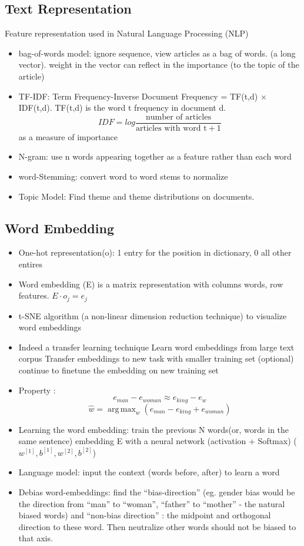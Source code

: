 \documentclass[11pt, openany]{book}              %
\DeclareMathOperator*{\argmax}{arg\,max}  %
\begin{document}
\subsection{Text Representation}

Feature representation used in Natural Language Processing (NLP)
\begin{itemize}
	\item bag-of-words model: ignore sequence, view articles as a bag of words. (a long vector). weight in the vector can reflect in the importance (to the topic of the article)
	\item TF-IDF: Term Frequency-Inverse Document Frequency = TF(t,d) $\times$ IDF(t,d). TF(t,d) is the word t frequency in document d. 
		$$IDF = log \frac{\text{number of articles}}{\text{articles with word t} + 1}$$
		as a measure of importance
	\item N-gram: use n words appearing together as a feature rather than each word
	\item word-Stemming: convert word to word stems to normalize
	\item Topic Model: Find theme and theme distributions on documents.
\end{itemize}
\subsection{Word Embedding}

\begin{itemize}
    \item One-hot representation(o): 1 entry for the position in dictionary, 0 all other entires
    \item Word embedding (E) is a matrix representation with columns words, row features.  $E \cdot o_j = e_j$
    \item t-SNE algorithm (a non-linear dimension reduction technique) to visualize word embeddings
    \item Indeed a transfer learning technique
    	\subitem Learn word embeddings from large text corpus
    	\subitem Transfer embeddings to new task with smaller training set 
    	\subitem (optional) continue to finetune the embedding on new training set
	\item Property : 
		$$e_{man} - e_{woman}  \approx e_{king} - e_{w}$$
		$$\hat{w} = \argmax_{w} (e_{man}  - e_{king} +e_{woman}) $$
	\item Learning the word embedding: train the previous N words(or, words in the same sentence) embedding E with a neural network (activation + Softmax) ( $w^{[1]}, b^{[1]}, w^{[2]}, b^{[2]}$) 
	\item Language model: input the context (words before, after) to learn a word 
	\item Debias word-embeddings: find the “bias-direction” (eg. gender bias would be the direction from “man” to “woman”, “father” to “mother” - the natural biased words) and “non-bias direction” : the midpoint and orthogonal direction to these word. Then neutralize other words should not be biased to that axis. 
\end{itemize}
\end{document}
